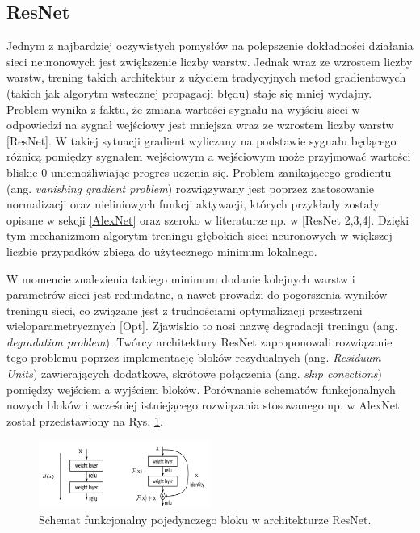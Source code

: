 \subsection{ResNet}

Jednym z najbardziej oczywistych pomysłów na polepszenie dokładności działania sieci neuronowych jest zwiększenie liczby warstw. Jednak wraz ze wzrostem liczby warstw, trening takich architektur z użyciem tradycyjnych metod gradientowych (takich jak algorytm wstecznej propagacji błędu) staje się mniej wydajny. Problem wynika z faktu, że zmiana wartości sygnału na wyjściu sieci w odpowiedzi na sygnał wejściowy jest mniejsza wraz ze wzrostem liczby warstw [ResNet]. W takiej sytuacji gradient wyliczany na podstawie sygnału będącego różnicą pomiędzy sygnałem wejściowym a wejściowym może przyjmować wartości bliskie 0 uniemożliwiając progres uczenia się. Problem zanikającego gradientu (ang. \textit{vanishing gradient problem}) rozwiązywany jest poprzez zastosowanie normalizacji oraz nieliniowych funkcji aktywacji, których przykłady zostały opisane w sekcji \ref{AlexNet} oraz szeroko w literaturze np. w [ResNet 2,3,4]. Dzięki tym mechanizmom algorytm treningu głębokich sieci neuronowych w większej liczbie przypadków zbiega do użytecznego minimum lokalnego. 

W momencie znalezienia takiego minimum dodanie kolejnych warstw i parametrów sieci jest redundatne, a nawet prowadzi do pogorszenia wyników treningu sieci, co związane jest z trudnościami optymalizacji przestrzeni wieloparametrycznych [Opt]. Zjawiskio to nosi nazwę degradacji treningu (ang. \textit{degradation problem}). Twórcy architektury ResNet zaproponowali rozwiązanie tego problemu poprzez implementację bloków rezydualnych (ang. \textit{Residuum Units}) zawierających dodatkowe, skrótowe połączenia (ang. \textit{skip conections}) pomiędzy wejściem a wyjściem bloków. Porównanie schematów funkcjonalnych nowych bloków i wcześniej istniejącego rozwiązania stosowanego np. w AlexNet został przedstawiony na Rys. \ref{ResNetBlock}.
\begin{figure}[h!]
	\centering
	\includegraphics[width=0.5\textwidth]{figures/ResidualBlock.jpg}
	\caption{Schemat funkcjonalny pojedynczego bloku w architekturze ResNet.}
	\label{ResNetBlock}
\end{figure} 

